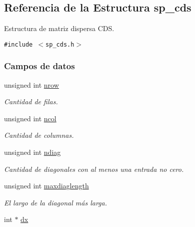 \hypertarget{structsp__cds}{
\subsection{Referencia de la Estructura sp\_\-cds}
\label{structsp__cds}
}
Estructura de matriz dispersa CDS.  


{\tt \#include $<$sp\_\-cds.h$>$}

\subsubsection*{Campos de datos}
\begin{CompactItemize}
\item 
\hypertarget{structsp__cds_742f0fa7433a0985c236c0df1811513a}{
unsigned int \hyperlink{structsp__cds_742f0fa7433a0985c236c0df1811513a}{nrow}}
\label{structsp__cds_742f0fa7433a0985c236c0df1811513a}

\begin{CompactList}\small\item\em Cantidad de filas. \item\end{CompactList}\item 
\hypertarget{structsp__cds_683cb5023edac60bd4c25a1c2261f6b0}{
unsigned int \hyperlink{structsp__cds_683cb5023edac60bd4c25a1c2261f6b0}{ncol}}
\label{structsp__cds_683cb5023edac60bd4c25a1c2261f6b0}

\begin{CompactList}\small\item\em Cantidad de columnas. \item\end{CompactList}\item 
\hypertarget{structsp__cds_f2a5117c4b15e96598d0a75a645cdb3f}{
unsigned int \hyperlink{structsp__cds_f2a5117c4b15e96598d0a75a645cdb3f}{ndiag}}
\label{structsp__cds_f2a5117c4b15e96598d0a75a645cdb3f}

\begin{CompactList}\small\item\em Cantidad de diagonales con al menos una entrada no cero. \item\end{CompactList}\item 
\hypertarget{structsp__cds_86bfcae3996588048cb6c973cd223b39}{
unsigned int \hyperlink{structsp__cds_86bfcae3996588048cb6c973cd223b39}{maxdiaglength}}
\label{structsp__cds_86bfcae3996588048cb6c973cd223b39}

\begin{CompactList}\small\item\em El largo de la diagonal más larga. \item\end{CompactList}\item 
\hypertarget{structsp__cds_cb3c554898b39c854cc3d26f657ce0fd}{
int $\ast$ \hyperlink{structsp__cds_cb3c554898b39c854cc3d26f657ce0fd}{dx}}
\label{structsp__cds_cb3c554898b39c854cc3d26f657ce0fd}


\end{CompactItemize}
